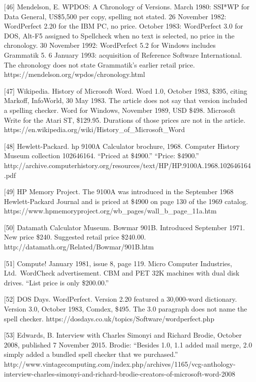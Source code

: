 \documentclass[
  10pt,
]{article}
\begin{document}
{[}46{]} Mendelson, E. WPDOS: A Chronology of Versions. March 1980:
SSI*WP for Data General, US\$5,500 per copy, spelling not stated. 26
November 1982: WordPerfect 2.20 for the IBM PC, no price. October 1983:
WordPerfect 3.0 for DOS, Alt-F5 assigned to Spellcheck when no text is
selected, no price in the chronology. 30 November 1992: WordPerfect 5.2
for Windows includes Grammatik 5. 6 January 1993: acquisition of
Reference Software International. The chronology does not state
Grammatik's earlier retail price.
https://mendelson.org/wpdos/chronology.html

{[}47{]} Wikipedia. History of Microsoft Word. Word 1.0, October 1983,
\$395, citing Markoff, InfoWorld, 30 May 1983. The article does not say
that version included a spelling checker. Word for Windows, November
1989, USD \$498. Microsoft Write for the Atari ST, \$129.95. Durations
of those prices are not in the article.
https://en.wikipedia.org/wiki/History\_of\_Microsoft\_Word

{[}48{]} Hewlett-Packard. hp 9100A Calculator brochure, 1968. Computer
History Museum collection 102646164. ``Priced at \$4900.'' ``Price:
\$4900.''
http://archive.computerhistory.org/resources/text/HP/HP.9100A.1968.102646164.pdf

{[}49{]} HP Memory Project. The 9100A was introduced in the September
1968 Hewlett-Packard Journal and is priced at \$4900 on page 130 of the
1969 catalog.
https://www.hpmemoryproject.org/wb\_pages/wall\_b\_page\_11a.htm

{[}50{]} Datamath Calculator Museum. Bowmar 901B. Introduced September
1971. New price \$240. Suggested retail price \$240.00.
http://datamath.org/Related/Bowmar/901B.htm

{[}51{]} Compute! January 1981, issue 8, page 119. Micro Computer
Industries, Ltd.~WordCheck advertisement. CBM and PET 32K machines with
dual disk drives. ``List price is only \$200.00.''

{[}52{]} DOS Days. WordPerfect. Version 2.20 featured a 30,000-word
dictionary. Version 3.0, October 1983, Comdex, \$495. The 3.0 paragraph
does not name the spell checker.
https://dosdays.co.uk/topics/Software/wordperfect.php

{[}53{]} Edwards, B. Interview with Charles Simonyi and Richard Brodie,
October 2008, published 7 November 2015. Brodie: ``Besides 1.0, 1.1
added mail merge, 2.0 simply added a bundled spell checker that we
purchased.''
http://www.vintagecomputing.com/index.php/archives/1165/vcg-anthology-interview-charles-simonyi-and-richard-brodie-creators-of-microsoft-word-2008
\end{document}
